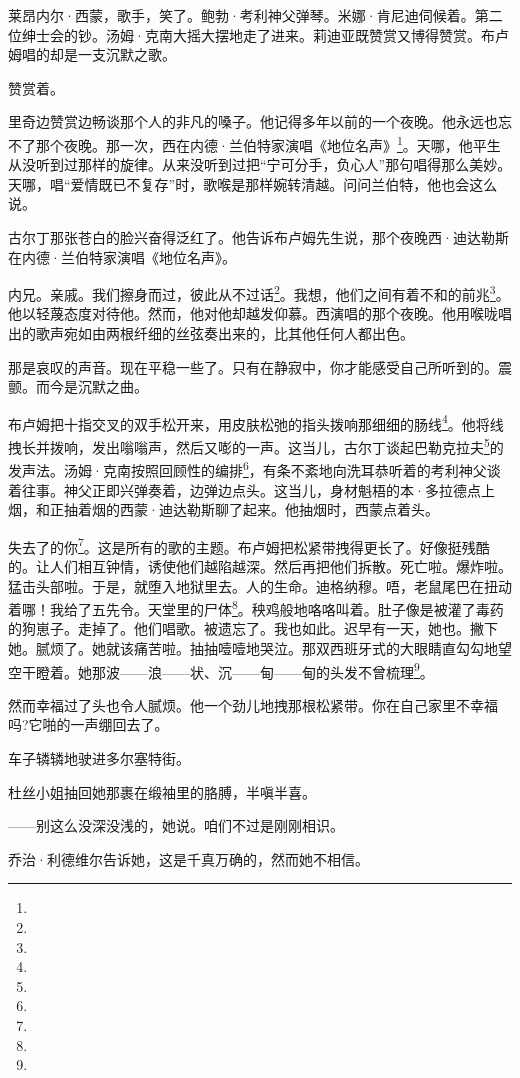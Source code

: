 \par 莱昂内尔·西蒙，歌手，笑了。鲍勃·考利神父弹琴。米娜·肯尼迪伺候着。第二位绅士会的钞。汤姆·克南大摇大摆地走了进来。莉迪亚既赞赏又博得赞赏。布卢姆唱的却是一支沉默之歌。
\par 赞赏着。
\par 里奇边赞赏边畅谈那个人的非凡的嗓子。他记得多年以前的一个夜晚。他永远也忘不了那个夜晚。那一次，西在内德·兰伯特家演唱《地位名声》\footnote{}。天哪，他平生从没听到过那样的旋律。从来没听到过把“宁可分手，负心人”那句唱得那么美妙。天哪，唱“爱情既已不复存”时，歌喉是那样婉转清越。问问兰伯特，他也会这么说。
\par 古尔丁那张苍白的脸兴奋得泛红了。他告诉布卢姆先生说，那个夜晚西·迪达勒斯在内德·兰伯特家演唱《地位名声》。
\par 内兄。亲戚。我们擦身而过，彼此从不过话\footnote{}。我想，他们之间有着不和的前兆\footnote{}。他以轻蔑态度对待他。然而，他对他却越发仰慕。西演唱的那个夜晚。他用喉咙唱出的歌声宛如由两根纤细的丝弦奏出来的，比其他任何人都出色。
\par 那是哀叹的声音。现在平稳一些了。只有在静寂中，你才能感受自己所听到的。震颤。而今是沉默之曲。
\par 布卢姆把十指交叉的双手松开来，用皮肤松弛的指头拨响那细细的肠线\footnote{}。他将线拽长并拨响，发出嗡嗡声，然后又嘭的一声。这当儿，古尔丁谈起巴勒克拉夫\footnote{}的发声法。汤姆·克南按照回顾性的编排\footnote{}，有条不紊地向洗耳恭听着的考利神父谈着往事。神父正即兴弹奏着，边弹边点头。这当儿，身材魁梧的本·多拉德点上烟，和正抽着烟的西蒙·迪达勒斯聊了起来。他抽烟时，西蒙点着头。
\par 失去了的你\footnote{}。这是所有的歌的主题。布卢姆把松紧带拽得更长了。好像挺残酷的。让人们相互钟情，诱使他们越陷越深。然后再把他们拆散。死亡啦。爆炸啦。猛击头部啦。于是，就堕入地狱里去。人的生命。迪格纳穆。唔，老鼠尾巴在扭动着哪！我给了五先令。天堂里的尸体\footnote{}。秧鸡般地咯咯叫着。肚子像是被灌了毒药的狗崽子。走掉了。他们唱歌。被遗忘了。我也如此。迟早有一天，她也。撇下她。腻烦了。她就该痛苦啦。抽抽噎噎地哭泣。那双西班牙式的大眼睛直勾勾地望空干瞪着。她那波——浪——状、沉——甸——甸的头发不曾梳理\footnote{}。
\par 然而幸福过了头也令人腻烦。他一个劲儿地拽那根松紧带。你在自己家里不幸福吗?它啪的一声绷回去了。
\par 车子辚辚地驶进多尔塞特街。
\par 杜丝小姐抽回她那裹在缎袖里的胳膊，半嗔半喜。
\par ——别这么没深没浅的，她说。咱们不过是刚刚相识。
\par 乔治·利德维尔告诉她，这是千真万确的，然而她不相信。
